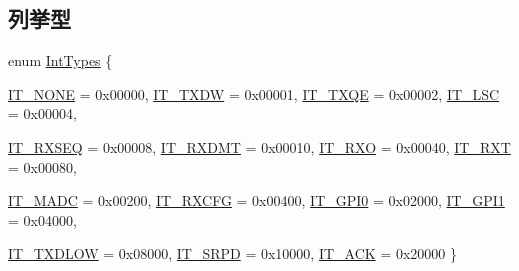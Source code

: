 \subsection*{列挙型}
\begin{DoxyCompactItemize}
\item 
enum \hyperlink{namespaceiGbReg_ab881f740bd3545d8eb42b05253752e9c}{IntTypes} \{ \par
\hyperlink{namespaceiGbReg_ab881f740bd3545d8eb42b05253752e9ca58e0db566cc170509a2e6cd9ecb6f643}{IT\_\-NONE} =  0x00000, 
\hyperlink{namespaceiGbReg_ab881f740bd3545d8eb42b05253752e9ca41242befdd855ef8192a0cad76e34a02}{IT\_\-TXDW} =  0x00001, 
\hyperlink{namespaceiGbReg_ab881f740bd3545d8eb42b05253752e9ca8970dcbfb859f26bfa07a586377d4455}{IT\_\-TXQE} =  0x00002, 
\hyperlink{namespaceiGbReg_ab881f740bd3545d8eb42b05253752e9ca9efb1a53e1557fd509318a197e3a0bc4}{IT\_\-LSC} =  0x00004, 
\par
\hyperlink{namespaceiGbReg_ab881f740bd3545d8eb42b05253752e9ca54659029c768bd858f1a6d33065e3925}{IT\_\-RXSEQ} =  0x00008, 
\hyperlink{namespaceiGbReg_ab881f740bd3545d8eb42b05253752e9ca74eadde240fb76053a8cd4776d9e39be}{IT\_\-RXDMT} =  0x00010, 
\hyperlink{namespaceiGbReg_ab881f740bd3545d8eb42b05253752e9ca235c7e40a1a2784ddb5740f5a4a85eba}{IT\_\-RXO} =  0x00040, 
\hyperlink{namespaceiGbReg_ab881f740bd3545d8eb42b05253752e9ca5de08c161325e1127c2727a0b234f9b3}{IT\_\-RXT} =  0x00080, 
\par
\hyperlink{namespaceiGbReg_ab881f740bd3545d8eb42b05253752e9ca011fe30216c5a9a8b0692d8a1b41ae34}{IT\_\-MADC} =  0x00200, 
\hyperlink{namespaceiGbReg_ab881f740bd3545d8eb42b05253752e9ca193606c00b9e4a2aab4b2e9acadd5a22}{IT\_\-RXCFG} =  0x00400, 
\hyperlink{namespaceiGbReg_ab881f740bd3545d8eb42b05253752e9cadde7414df8f2baf097108dd15a031af9}{IT\_\-GPI0} =  0x02000, 
\hyperlink{namespaceiGbReg_ab881f740bd3545d8eb42b05253752e9cad8ea3d9d603aae5a5f65ae850ebd1491}{IT\_\-GPI1} =  0x04000, 
\par
\hyperlink{namespaceiGbReg_ab881f740bd3545d8eb42b05253752e9ca3bf746c26536ce7825047a493b1f1485}{IT\_\-TXDLOW} =  0x08000, 
\hyperlink{namespaceiGbReg_ab881f740bd3545d8eb42b05253752e9ca72e21e36635d99d0b77bd21cd52a4815}{IT\_\-SRPD} =  0x10000, 
\hyperlink{namespaceiGbReg_ab881f740bd3545d8eb42b05253752e9ca70a1f84a3694d89a9950f0aac28d198a}{IT\_\-ACK} =  0x20000
 \}
\end{DoxyCompactItemize}
